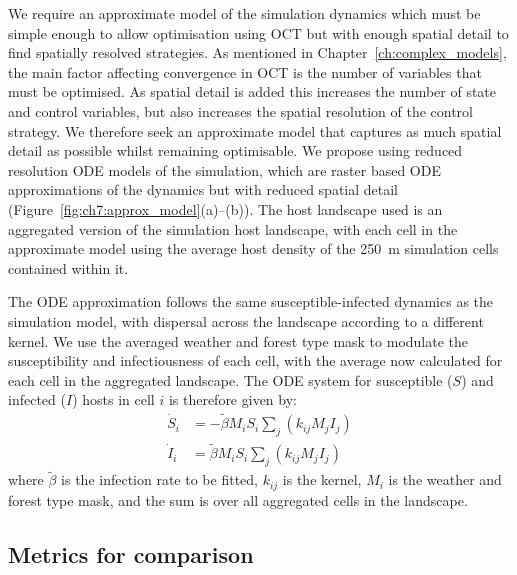 We require an approximate model of the simulation dynamics which must be simple enough to allow optimisation using OCT but with enough spatial detail to find spatially resolved strategies. As mentioned in Chapter~\ref{ch:complex_models}, the main factor affecting convergence in OCT is the number of variables that must be optimised. As spatial detail is added this increases the number of state and control variables, but also increases the spatial resolution of the control strategy. We therefore seek an approximate model that captures as much spatial detail as possible whilst remaining optimisable. We propose using reduced resolution ODE models of the simulation, which are raster based ODE approximations of the dynamics but with reduced spatial detail (Figure~\ref{fig:ch7:approx_model}(a)--(b)). The host landscape used is an aggregated version of the simulation host landscape, with each cell in the approximate model using the average host density of the \SI{250}{\meter} simulation cells contained within it.

The ODE approximation follows the same susceptible-infected dynamics as the simulation model, with dispersal across the landscape according to a different kernel. We use the averaged weather and forest type mask to modulate the susceptibility and infectiousness of each cell, with the average now calculated for each cell in the aggregated landscape. The ODE system for susceptible ($S$) and infected ($I$) hosts in cell $i$ is therefore given by:
\begin{subequations}
    \label{eqn:ch7:approx_model}
    \begin{align}
        \dot{S}_i &= -\tilde{\beta}M_iS_i\sum_j\left(k_{ij}M_jI_j\right) \\
        \dot{I}_i &= \tilde{\beta}M_iS_i\sum_j\left(k_{ij}M_jI_j\right)
    \end{align}
\end{subequations}
where $\tilde{\beta}$ is the infection rate to be fitted, $k_{ij}$ is the kernel, $M_i$ is the weather and forest type mask, and the sum is over all aggregated cells in the landscape.

\subsection{Metrics for comparison}

